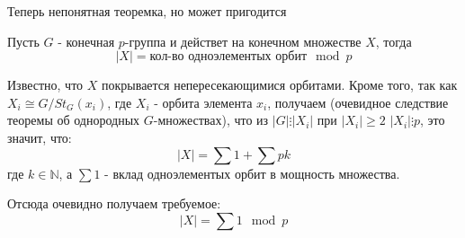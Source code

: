 Теперь непонятная теоремка, но может пригодится

\begin{Th}
Пусть $G$ - конечная $p$-группа и действет на конечном множестве $X$, тогда
\[
	\left|X\right| = \text{кол-во одноэлементых орбит} \mod p
\]
\end{Th}

\begin{Def}
Известно, что $X$ покрывается непересекающимися орбитами. Кроме того, так как $X_i \cong G / St_G\left(x_i\right)$, где $X_i$ - орбита элемента $x_i$, получаем (очевидное следствие теоремы об однородных $G$-множествах), что из $\left|G\right| \vdots \left|X_i\right|$ при $\left|X_i\right| \ge 2$ $\left|X_i\right| \vdots p$, это значит, что:
\[
	\left|X\right| = \sum 1 + \sum p k
\]
где $k \in \mathbb{N}$, а $\sum 1$ - вклад одноэлементых орбит в мощность множества.

Отсюда очевидно получаем требуемое:
\[
	\left|X\right| = \sum 1 \mod p
\]
\end{Def}
